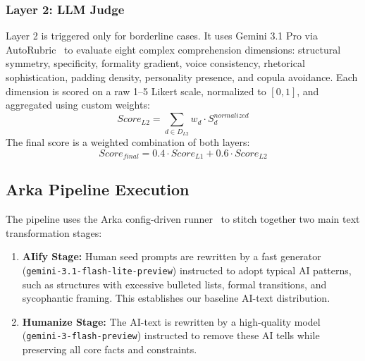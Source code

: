 \documentclass{article}
\begin{document}
\subsubsection{Layer 2: LLM Judge}
Layer 2 is triggered only for borderline cases. It uses Gemini 3.1 Pro via AutoRubric~\citep{autorubric2026} to evaluate eight complex comprehension dimensions: structural symmetry, specificity, formality gradient, voice consistency, rhetorical sophistication, padding density, personality presence, and copula avoidance.
Each dimension is scored on a raw 1--5 Likert scale, normalized to $[0, 1]$, and aggregated using custom weights:
\begin{equation}
    Score_{L2} = \sum_{d \in D_{L2}} w_d \cdot S_d^{normalized}
\end{equation}
The final score is a weighted combination of both layers:
\begin{equation}
    Score_{final} = 0.4 \cdot Score_{L1} + 0.6 \cdot Score_{L2}
\end{equation}

\subsection{Arka Pipeline Execution}
The pipeline uses the Arka config-driven runner~\citep{arka} to stitch together two main text transformation stages:
\begin{enumerate}
    \item \textbf{AIify Stage:} Human seed prompts are rewritten by a fast generator (\texttt{gemini-3.1-flash-lite-preview}) instructed to adopt typical AI patterns, such as structures with excessive bulleted lists, formal transitions, and sycophantic framing. This establishes our baseline AI-text distribution.
    \item \textbf{Humanize Stage:} The AI-text is rewritten by a high-quality model (\texttt{gemini-3-flash-preview}) instructed to remove these AI tells while preserving all core facts and constraints.
\end{enumerate}
\end{document}
